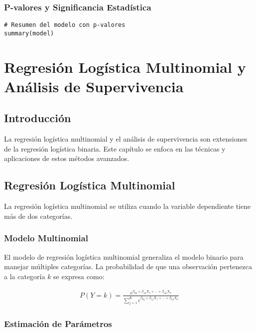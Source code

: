 \documentclass[a4paper]{report} %
\begin{document}
\subsection{P-valores y Significancia Estad\'istica}

\begin{verbatim}
# Resumen del modelo con p-valores
summary(model)
\end{verbatim}



\chapter{Regresión Logística Multinomial y Análisis de Supervivencia}

\section{Introducci\'on}

La regresi\'on log\'istica multinomial y el an\'alisis de supervivencia son extensiones de la regresi\'on log\'istica binaria. Este cap\'itulo se enfoca en las t\'ecnicas y aplicaciones de estos m\'etodos avanzados.

\section{Regresi\'on Log\'istica Multinomial}

La regresi\'on log\'istica multinomial se utiliza cuando la variable dependiente tiene m\'as de dos categor\'ias.

\subsection{Modelo Multinomial}

El modelo de regresi\'on log\'istica multinomial generaliza el modelo binario para manejar m\'ultiples categor\'ias. La probabilidad de que una observaci\'on pertenezca a la categor\'ia $k$ se expresa como:

\begin{eqnarray*}
P(Y = k) = \frac{e^{\beta_{0k} + \beta_{1k} X_1 + \ldots + \beta_{nk} X_n}}{\sum_{j=1}^{K} e^{\beta_{0j} + \beta_{1j} X_1 + \ldots + \beta_{nj} X_n}}
\end{eqnarray*}

\subsection{Estimaci\'on de Par\'ametros}
\end{document}

